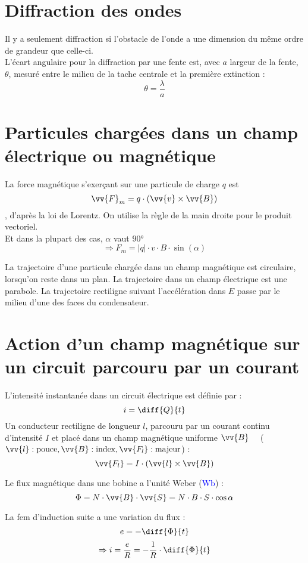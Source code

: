 \documentclass[../MAIN/main.tex]{subfiles}
\begin{document}
\section{Diffraction des ondes}

\begin{Definition}

Il y a seulement diffraction si l'obstacle de l'onde a une dimension du même ordre de grandeur que celle-ci.\\
L'écart angulaire pour la diffraction par une fente est, avec $a$ largeur de la fente, $\theta$, mesuré entre le milieu de la tache centrale et la première extinction :
$$\theta=\dfrac{\lambda}{a}$$

\end{Definition}


\section{Particules chargées dans un champ électrique ou magnétique}

\begin{Definition}

La force magnétique s'exerçant sur une particule de charge $q$ est
$$\vv{F}_{m} = q \cdot (\vv{v}\times \vv{B})$$,
d'après la loi de Lorentz. On utilise la règle de la main droite pour le produit vectoriel. \\
Et dans la plupart des cas, $\alpha$ vaut $\ang{90}$
$$\Rightarrow F_{m} = |q| \cdot v \cdot B \cdot \sin(\alpha)$$

La trajectoire d'une particule chargée dans un champ magnétique est circulaire, lorsqu'on reste dans un plan. La trajectoire dans un champ électrique est une parabole. La trajectoire rectiligne suivant l'accélération dans $E$ passe par le milieu d'une des faces du condensateur.

\end{Definition}


\section{Action d'un champ magnétique sur un circuit parcouru par un courant}


\begin{Definition}
L'intensité instantanée dans un circuit électrique est définie par :
$$i = \diff{Q}{t}$$
Un conducteur rectiligne de longueur $l$, parcouru par un courant continu d'intensité $I$ et placé dans un champ magnétique uniforme $\vv{B} \quad$  ($\vv{l}: \text{pouce}, \vv{B}: \text{index}, \vv{F_{l}}: \text{majeur} $) :
$$\vv{F_{l}} = I \cdot (\vv{l} \times \vv{B})$$

Le flux magnétique dans une bobine a l'unité Weber (\textcolor{blue}{Wb}) : 
$$ \Phi = N \cdot \vv{B} \cdot \vv{S} = N \cdot B \cdot S \cdot \cos{\alpha}$$

La fem d'induction suite a une variation du flux :
$$e=-\diff{\Phi}{t}$$
$$\Rightarrow i = \dfrac{e}{R} = - \dfrac{1}{R} \cdot \diff{\Phi}{t}$$
\end{Definition}
\end{document}
